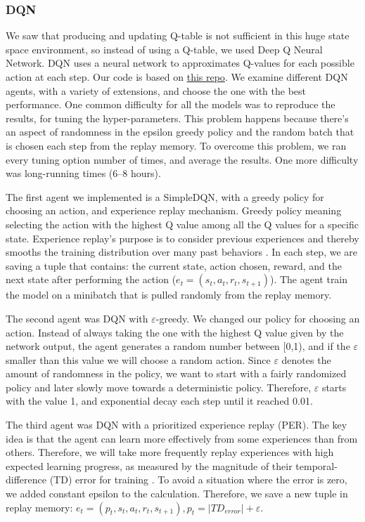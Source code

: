 \documentclass{article}
\begin{document}
	\subsubsection{DQN}
	We saw that producing and updating Q-table is not sufficient in this huge state space environment, so
	instead of using a Q-table, we used Deep Q Neural Network. DQN uses a neural network to approximates
	Q-values for each possible action at each step. Our code is based on \href{https://github.com
		shivaverma/OpenAIGym/tree/master/lunar-lander/discrete}{this repo}. We examine different DQN agents,
	with a variety of extensions, and choose the one with the best performance. 
	One common difficulty for all the models was to reproduce the results, for tuning the hyper-parameters. This problem happens because there's an aspect of randomness in the epsilon greedy policy
	and the random batch that is chosen each step from the replay memory. To overcome this problem, we ran
	every tuning option number of times, and average the results. One more difficulty was long-running
	times (6--8 hours).
	
	The first agent we implemented is a SimpleDQN, with a greedy policy for choosing an action, and
	experience replay mechanism.
	Greedy policy meaning selecting the action with the highest Q value among all the Q values for a
	specific state. Experience replay's purpose is to consider previous experiences and thereby smooths
	the training distribution over many past behaviors \cite{mnih2013playing}. In each step, we are saving
	a tuple that contains: the current state, action chosen, reward, and the next
	state after performing the action ($ e_t = (s_t, a_t, r_t, s_{t+1}) $). The agent train the model on a minibatch that is pulled
	randomly from the replay memory.
	
	The second agent was DQN with $\varepsilon$-greedy. We changed our policy for choosing an action.
	Instead of always taking the one with the highest Q value given by the network output, the agent
	generates a random number between [0,1), and if the $\varepsilon$ smaller than this value we will
	choose a random action. Since $\varepsilon$ denotes the amount of randomness in the policy, we want to
	start with a fairly randomized policy and later slowly move towards a deterministic policy. Therefore,
	$\varepsilon$ starts with the value 1, and exponential decay each step until it reached 0.01. 
	
	The third agent was DQN with a prioritized experience replay (PER). The key idea is that the agent can
	learn more effectively from some experiences than from others. Therefore, we will take more frequently
	replay experiences with high expected learning progress, as measured by the magnitude of their
	temporal-difference (TD) error for training \cite{schaul2015prioritized}.  To avoid a
	situation where the error is zero, we added constant epsilon to the calculation. Therefore, we save a new tuple in replay memory:  $ e_t = (p_t, s_t, a_t, r_t, s_{t+1}),   p_t = |TD_{error}| + \varepsilon $.	
	
\end{document}
